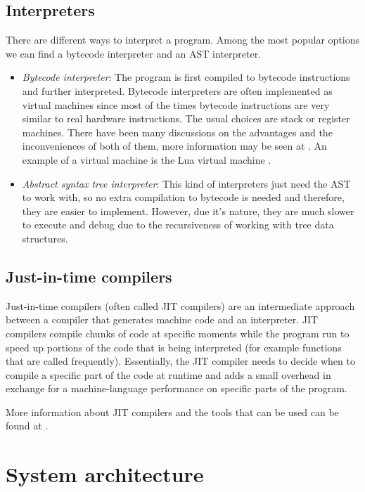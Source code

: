 \subsection{Interpreters}

There are different ways to interpret a program. Among the most popular options we can find a bytecode interpreter and an AST interpreter.

\begin{itemize}
    \item \emph{Bytecode interpreter}: The program is first compiled to bytecode instructions and further interpreted. Bytecode interpreters are often
        implemented as virtual machines since most of the times bytecode instructions are very similar to real hardware instructions.
        The usual choices are stack or register machines. There have been many discussions on the advantages and the inconveniences of both of them, more information may be seen at \autocite{stack_vs_register}. An example of a virtual machine is the Lua virtual machine \autocite{the_implementation_of_lua}.
    \item \emph{Abstract syntax tree interpreter}: This kind of interpreters just need the AST to work with, so no extra compilation to bytecode
        is needed and therefore, they are easier to implement. However, due it's nature, they are much slower to execute and debug due to the recursiveness of working with tree data structures.
\end{itemize}

\subsection{Just-in-time compilers}

Just-in-time compilers (often called JIT compilers) are an intermediate approach between a compiler that generates machine code and an interpreter.
JIT compilers compile chunks of code at specific moments while the program run to speed up portions of the code that is being interpreted
(for example functions that are called frequently). Essentially, the JIT compiler needs to decide when to compile a specific part of the code at
runtime and adds a small overhead in exchange for a machine-language performance on specific parts of the program.

More information about JIT compilers and the tools that can be used can be found at \autocite{jit_compilation}.

\section{System architecture}
\label{sec:sys_arch}

